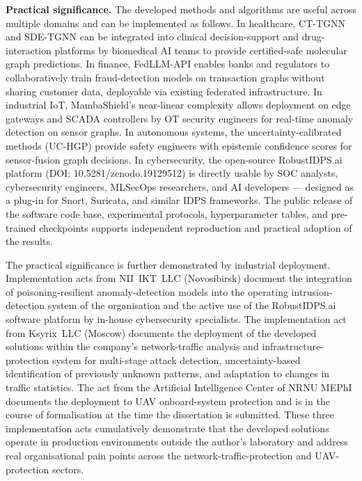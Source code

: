 \textbf{Practical significance.} The developed methods and algorithms are useful across multiple domains and can be implemented as follows. In healthcare, CT-TGNN and SDE-TGNN can be integrated into clinical decision-support and drug-interaction platforms by biomedical AI teams to provide certified-safe molecular graph predictions. In finance, FedLLM-API enables banks and regulators to collaboratively train fraud-detection models on transaction graphs without sharing customer data, deployable via existing federated infrastructure. In industrial IoT, MambaShield's near-linear complexity allows deployment on edge gateways and SCADA controllers by OT security engineers for real-time anomaly detection on sensor graphs. In autonomous systems, the uncertainty-calibrated methods (UC-HGP) provide safety engineers with epistemic confidence scores for sensor-fusion graph decisions. In cybersecurity, the open-source RobustIDPS.ai platform (DOI: 10.5281/zenodo.19129512) is directly usable by SOC analysts, cybersecurity engineers, MLSecOps researchers, and AI developers --- designed as a plug-in for Snort, Suricata, and similar IDPS frameworks. The public release of the software code base, experimental protocols, hyperparameter tables, and pre-trained checkpoints supports independent reproduction and practical adoption of the results.

The practical significance is further demonstrated by industrial deployment. Implementation acts from NII~IKT~LLC (Novosibirsk) document the integration of poisoning-resilient anomaly-detection models into the operating intrusion-detection system of the organisation and the active use of the RobustIDPS.ai software platform by in-house cybersecurity specialists. The implementation act from Ksyrix~LLC (Moscow) documents the deployment of the developed solutions within the company's network-traffic analysis and infrastructure-protection system for multi-stage attack detection, uncertainty-based identification of previously unknown patterns, and adaptation to changes in traffic statistics. The act from the Artificial Intelligence Center of NRNU MEPhI documents the deployment to UAV onboard-system protection and is in the course of formalisation at the time the dissertation is submitted. These three implementation acts cumulatively demonstrate that the developed solutions operate in production environments outside the author's laboratory and address real organisational pain points across the network-traffic-protection and UAV-protection sectors.

